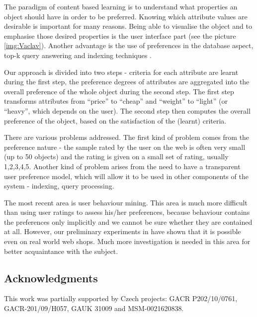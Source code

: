 \documentclass[runningheads,a4paper]{llncs}
\begin{document}
The paradigm of content based learning is to understand what properties an object should have in order to be preferred. Knowing which attribute values are desirable is important for many reasons. Being able to visualise the object and to emphasise those desired properties is the user interface part \cite{biblio:FiserMaster} (see the picture \ref{img:Vaclav}). Another advantage is the use of preferences in the database aspect, top-k query answering and indexing techniques \cite{Fagin:2001:OAA:375551.375567}. 


Our approach is divided into two steps - criteria for each attribute are learnt during the first step, the preference degrees of attributes are aggregated into the overall preference of the whole object during the second step. The first step transforms attributes from ``price'' to ``cheap'' and ``weight'' to ``light'' (or ``heavy'', which depends on the user). The second step then computes the overall preference of the object, based on the satisfaction of the (learnt) criteria.


There are various problems addressed. The first kind of problem comes from the preference nature - the sample rated by the user on the web is often very small (up to 50 objects) and the rating is given on a small set of rating, usually 1,2,3,4,5. Another kind of problem arises from the need to have a transparent user preference model, which will allow it to be used in other components of the system - indexing, query processing.


The most recent area is user behaviour mining. This area is much more difficult than using user ratings to assess his/her preferences, because behaviour contains the preferences only implicitly and we cannot be sure whether they are contained at all. However, our preliminary experiments in \cite{biblio:Peska} have shown that it is possible even on real world web shops. Much more investigation is needed in this area for better acquaintance with the subject. 




\subsection*{Acknowledgments}
This work was partially supported by Czech projects: GACR P202/10/0761, GACR-201/09/H057, GAUK 31009 and MSM-0021620838.



\end{document}
